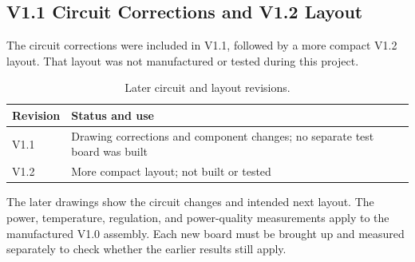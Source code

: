 \subsection{V1.1 Circuit Corrections and V1.2 Layout}
\label{sec:hw-unmanufactured-revisions}

The circuit corrections were included in V1.1, followed by a more compact V1.2 layout. That layout was not manufactured or tested during this project.

\begin{table}[H]
\centering
\caption{Later circuit and layout revisions.}
\label{tab:unmanufactured-board-revisions}
\begin{tabularx}{\textwidth}{@{}p{}X@{}}
\toprule
Revision & Status and use\\
\midrule
V1.1 & Drawing corrections and component changes; no separate test board was built\\
V1.2 & More compact layout; not built or tested\\
\bottomrule
\end{tabularx}
\end{table}

The later drawings show the circuit changes and intended next layout. The power, temperature, regulation, and power-quality measurements apply to the manufactured V1.0 assembly. Each new board must be brought up and measured separately to check whether the earlier results still apply.
